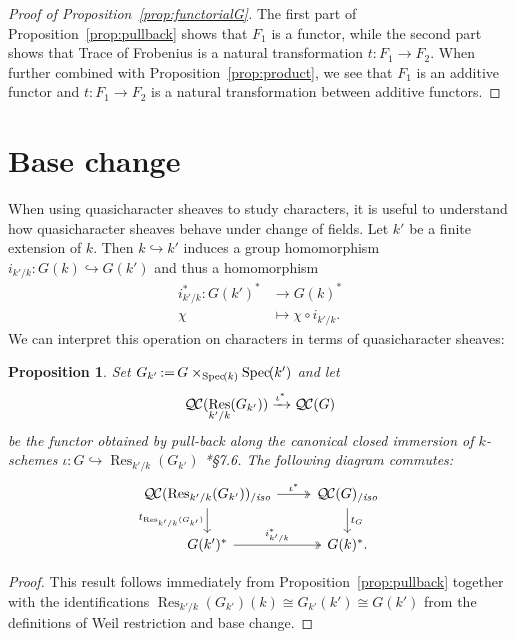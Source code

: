 \documentclass[11pt]{amsart}
\theoremstyle{plain}
\newtheorem{proposition}[theorem]{Proposition}
\theoremstyle{definition}
\theoremstyle{remark}
\newcommand{\Spec}[1]{{\operatorname{Spec}\hskip-1pt( #1 )}}
\DeclareMathOperator{\Res}{Res}
\newcommand{\ceq}{{\, :=\, }}
\newcommand{\QC}{{\mathcal{Q\hskip-0.8pt C}}}
\newcommand{\QCiso}[1]{\QC(#1)_{/\textit{iso}}}
\newcommand{\trFrob}[1]{t_{#1}}
\begin{document}
\begin{proof}[Proof of Proposition~\ref{prop:functorialG}]
The first part of Proposition~\ref{prop:pullback} shows that $F_1$ is a functor,
while the second part shows that Trace of Frobenius is a natural transformation
$t: F_1 \to F_2$. When further combined with Proposition~\ref{prop:product},
we see that $F_1$ is an additive functor and $t: F_1 \to F_2$ is a natural
transformation between additive functors.
\end{proof}

\section{Base change}\label{sec:basechange}

When using quasicharacter sheaves to study characters, it is useful to understand
how quasicharacter sheaves behave under change of fields.
Let $k'$ be a finite extension of $k$. Then $k \hookrightarrow k'$ induces a group homomorphism
$i_{k'/k} : G(k) \hookrightarrow G(k')$ and thus a homomorphism
\begin{align*}
i_{k'/k}^* : G(k')^* &\to G(k)^* \\
\chi &\mapsto \chi\circ i_{k'/k}.
\end{align*}
We can interpret this operation on characters in terms of quasicharacter sheaves:
%

\begin{proposition} \label{prop:csbe}
Set $G_{k'} \ceq G\times_\Spec{k} \Spec{k'}$ and let
\[
\QC(\Res_{k'/k}(G_{k'})) \xrightarrow{\iota^*} \QC(G)
\]
be the functor obtained by pull-back along the canonical closed immersion of $k$-schemes
$\iota : G \hookrightarrow \Res_{k'/k}(G_{k'})$
\cite{bosch-lutkebohmert-reynaud:NeronModels}*{\S 7.6}. 
The following diagram commutes:
\[
\begin{tikzcd}
\QCiso{\Res_{k'/k}(G_{k'})} \arrow[two heads]{r}{\iota^*} \dar[swap]{\trFrob{\Res_{k'/k}(G_{k'})}} & \QCiso{G} \dar{\trFrob{G}} \\
G(k')^* \arrow[two heads]{r}{i_{k'/k}^*} & G(k)^*.
\end{tikzcd}
\]
\end{proposition}
\begin{proof}
This result follows immediately from Proposition~\ref{prop:pullback} together with the identifications
$\Res_{k'/k}(G_{k'})(k) \cong G_{k'}(k') \cong G(k')$ from the definitions of Weil restriction and base change.
\end{proof}
\end{document}
